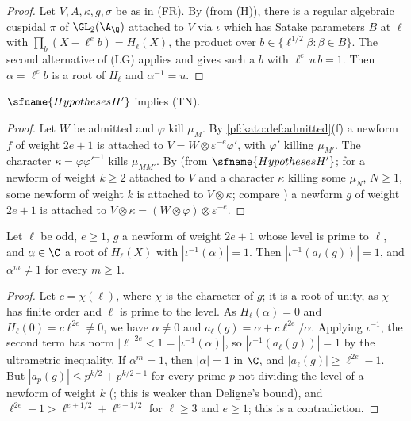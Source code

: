 \begin{proof}
Let $V,A,\kappa,g,\sigma$ be as in \textup{(FR)}. By
 (from \textup{(H)}),
there is a regular algebraic cuspidal $\pi$ of $\GL_2(\A_\Q)$ attached to $V$ via $\iota$ which has Satake parameters
$B$ at $\ell$ with $\prod_{b}(X-\ell^{e}b)=H_\ell(X)$, the product over $b\in\{\ell^{1/2}\beta:\beta\in B\}$. The second
alternative of \textup{(LG)} applies and gives such a $b$ with $\ell^e\,u\,b=1$. Then $\alpha=\ell^eb$ is a root
of $H_\ell$ and $\alpha^{-1}=u$.
\end{proof}

\begin{theorem}\label{pf:kato:twnew}
$\sfname{HypothesesH'}$ implies \textup{(TN)}.
\end{theorem}

\begin{proof}
Let $W$ be admitted and $\varphi$ kill $\mu_M$. By \cref{pf:kato:def:admitted}(f) a newform $f$ of weight $2e+1$ is
attached to $V=W\otimes\varepsilon^{-e}\varphi'$, with $\varphi'$ killing $\mu_{M'}$. The character $\kappa=\varphi\varphi'^{-1}$
kills $\mu_{MM'}$. By 
(from $\sfname{HypothesesH'}$; for a newform of weight $k\ge2$ attached to $V$ and a character $\kappa$ killing some
$\mu_{N}$, $N\ge1$, some newform of weight $k$ is attached to $V\otimes\kappa$; compare \cite{AtkinLi1978}) a newform
$g$ of weight $2e+1$ is attached to $V\otimes\kappa=(W\otimes\varphi)\otimes\varepsilon^{-e}$.
\end{proof}

\begin{lemma}\label{pf:kato:unitroot}
Let $\ell$ be odd, $e\ge1$, $g$ a newform of weight $2e+1$ whose level is prime to $\ell$, and $\alpha\in\C$ a root of $H_\ell(X)$ with
$|\iota^{-1}(\alpha)|=1$. Then $|\iota^{-1}(a_\ell(g))|=1$, and $\alpha^m\ne1$ for every $m\ge1$.
\end{lemma}

\begin{proof}
Let $c=\chi(\ell)$, where $\chi$ is the character of $g$; it is a root of unity, as $\chi$ has finite order and $\ell$ is prime to the
level. As $H_\ell(\alpha)=0$ and $H_\ell(0)=c\ell^{2e}\ne0$, we have $\alpha\ne0$ and $a_\ell(g)=\alpha+c\ell^{2e}/\alpha$. Applying $\iota^{-1}$, the
second term has norm $|\ell|^{2e}<1=|\iota^{-1}(\alpha)|$, so $|\iota^{-1}(a_\ell(g))|=1$ by the ultrametric inequality. If $\alpha^m=1$, then
$|\alpha|=1$ in $\C$, and $|a_\ell(g)|\ge\ell^{2e}-1$. But $|a_p(g)|\le p^{k/2}+p^{k/2-1}$ for every prime $p$ not dividing the level of a
newform of weight $k$ (; this is weaker than Deligne's bound), and
$\ell^{2e}-1>\ell^{e+1/2}+\ell^{e-1/2}$ for $\ell\ge3$ and $e\ge1$; this is a contradiction.
\end{proof}

